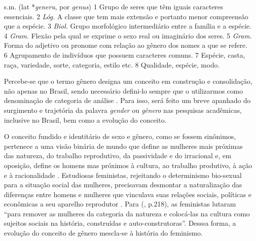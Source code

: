\begin{citacao}
s.m. (lat *\emph{generu}, por \emph{genus}) 1 Grupo de seres que têm iguais caracteres essenciais. 2 \emph{Lóg.} A classe que tem mais extensão e portanto menor compreensão que a espécie. 3 \emph{Biol.} Grupo morfológico intermediário entre a família e a espécie. 4 \emph{Gram.} Flexão pela qual se exprime o sexo real ou imaginário dos seres. 5 \emph{Gram.} Forma do adjetivo ou pronome com relação ao gênero dos nomes a que se refere. 6 Agrupamento de indivíduos que possuem caracteres comuns. 7 Espécie, casta, raça, variedade, sorte, categoria, estilo etc. 8 Qualidade, espécie, modo.
\end{citacao}

Percebe-se que o termo gênero designa um conceito em construção e consolidação, não apenas no Brasil, sendo necessário defini-lo sempre que o utilizarmos como denominação de categoria de análise \cite{MORAES1998}. Para isso, será feito um breve apanhado do surgimento e trajetória da palavra \emph{gender} ou \emph{gênero} nas pesquisas acadêmicas, inclusive no Brasil, bem como a evolução do conceito.

O conceito fundido e identitário de sexo e gênero, como se fossem sinônimos, pertenece a uma visão binária de mundo que define as mulheres mais próximas das natureza, do trabalho reprodutivo, da passividade e do irracional e, em oposição, define os homens mas próximos à cultura, ao trabalho produtivo, à ação e à racionalidade \cite{HARAWAY2004}.
Estudiosas feministas, rejeitando o determinismo bio-sexual para a situação social das mulheres, precisavam desmontar a naturalização das diferenças entre homens e mulheres que vinculava suas relações sociais, políticas e econômicas a seu aparelho reprodutor \cite{PISCITELLI2009}. 
Para  (\citeyear{HARAWAY2004}, p.218), as feministas lutaram ``para remover as mulheres da categoria da natureza e colocá-las na cultura como sujeitos sociais na história, construídas e auto-construtoras''. Desssa forma, a evolução do conceito de gênero mescla-se à história do feminismo.

